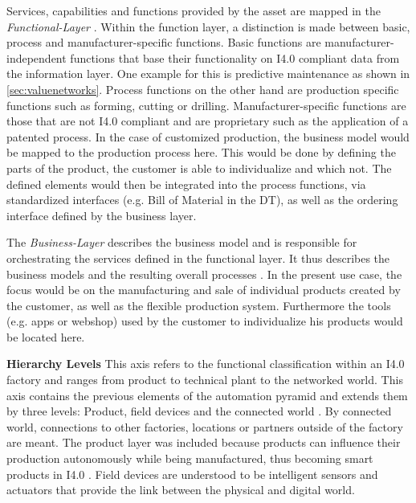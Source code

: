 Services, capabilities and functions provided by the asset are mapped in the \textit{Functional-Layer} \cite[p. 51]{Heidel2017ReferenzarchitekturmodellIndustrie4.0Komponente}. Within the function layer, a distinction is made between basic, process and manufacturer-specific functions. Basic functions are manufacturer-independent functions that base their functionality on \ac{I4.0} compliant data from the information layer. One example for this is predictive maintenance as shown in \ref{sec:valuenetworks}. Process functions on the other hand are production specific functions such as forming, cutting or drilling. Manufacturer-specific functions are those that are not \ac{I4.0} compliant and are proprietary such as the application of a patented process. In the case of customized production, the business model would be mapped to the production process here. This would be done by defining the parts of the product, the customer is able to individualize and which not. The defined elements would then be integrated into the process functions, via standardized interfaces (e.g. Bill of Material in the \ac{DT}), as well as the ordering interface defined by the business layer.  
    
The \textit{Business-Layer} describes the business model and is responsible for orchestrating the services defined in the functional layer. It thus describes the business models and the resulting overall processes \cite[p. 53]{Heidel2017ReferenzarchitekturmodellIndustrie4.0Komponente}. In the present use case, the focus would be on the manufacturing and sale of individual products created by the customer, as well as the flexible production system. Furthermore the tools (e.g. apps or webshop) used by the customer to individualize his products would be located here.
    
\textbf{Hierarchy Levels} This axis refers to the functional classification within an \ac{I4.0} factory and ranges from product to technical plant to the networked world. This axis contains the previous elements of the automation pyramid and extends them by three levels: Product, field devices and the connected world \cite[p. 44]{Heidel2017ReferenzarchitekturmodellIndustrie4.0Komponente}. By connected world, connections to other factories, locations or partners outside of the factory are meant. The product layer was included because products can influence their production autonomously while being manufactured, thus becoming smart products in \ac{I4.0} \cite[p. 21]{Acatech2013Recommendations4.0}. Field devices are understood to be intelligent sensors and actuators that provide the link between the physical and digital world.  

